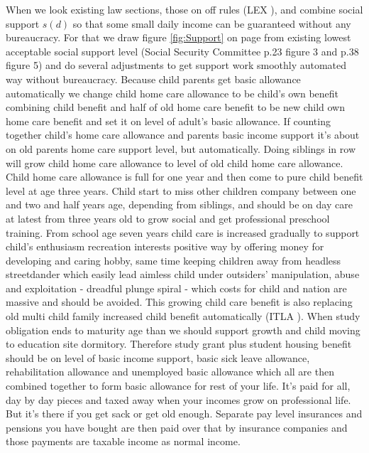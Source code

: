 When we look existing law sections, those on off rules (LEX \cite{LEX_2012_916}),
and combine social support $s(d)$ so that some small daily income can be guaranteed without any bureaucracy.
For that we draw figure \ref{fig:Support} on page \pageref{fig:Support} from existing lowest acceptable social support level
(Social Security Committee \cite{VN_2023_26} p.23 figure 3 and p.38 figure 5)
and do several adjustments to get support work smoothly automated way without bureaucracy.
Because child parents get basic allowance automatically we change child home care allowance to be child's own benefit
combining child benefit and half of old home care benefit to be new child own home care benefit and set it on level of adult's basic allowance.
If counting together child's home care allowance and parents basic income support it's about on old parents home care support level, but automatically.
Doing siblings in row will grow child home care allowance to level of old child home care allowance.
Child home care allowance is full for one year and then come to pure child benefit level at age three years.
Child start to miss other children company between one and two and half years age, depending from siblings,
and should be on day care at latest from three years old to grow social and get professional preschool training.
From school age seven years child care is increased gradually to support child's enthusiasm recreation interests positive way by offering money for developing and caring hobby,
same time keeping children away from headless streetdander which easily lead aimless child under
outsiders' manipulation, abuse and exploitation - dreadful plunge spiral - which costs for child
and nation are massive and should be avoided.
This growing child care benefit is also replacing old multi child family increased child benefit automatically (ITLA \cite{ITLA_2023_LL}).
When study obligation ends to maturity age than we should support growth and child moving to education site dormitory.
Therefore study grant plus student housing benefit should be on level of basic income support,
basic sick leave allowance, rehabilitation allowance and unemployed basic allowance
which all are then combined together to form basic allowance for rest of your life.
It's paid for all, day by day pieces and taxed away when your incomes grow on professional life.
But it's there if you get sack or get old enough.
Separate pay level insurances and pensions you have bought are then paid over that by insurance companies
and those payments are taxable income as normal income.

